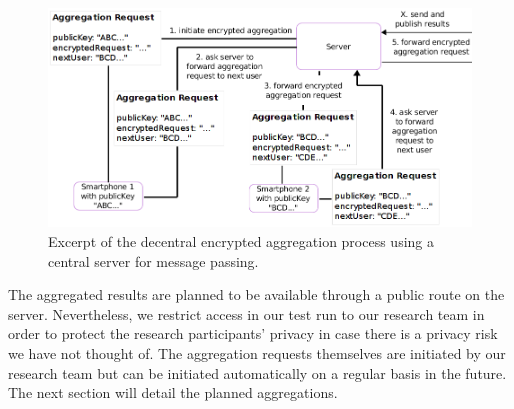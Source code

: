  \begin{figure}[h!]
	\includegraphics[width=\textwidth]{data/diagrams/decentral-encrypted-aggregation.png}
	\caption{Excerpt of the decentral encrypted aggregation process using a central server for message passing.}
	\label{decentral-aggregation-encrypted}
\end{figure}

 The aggregated results are planned to be available through a public route on the server. Nevertheless, we restrict access in our test run to our research team in order to protect the research participants' privacy in case there is a privacy risk we have not thought of. The aggregation requests themselves are initiated by our research team but can be initiated automatically on a regular basis in the future. The next section will detail the planned aggregations.

